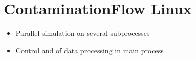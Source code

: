 
\chapter{ContaminationFlow Linux}\label{chapter:Linux}
\begin{itemize}[noitemsep,topsep=0pt, partopsep=0pt]
\item Parallel simulation on several subprocesses
\item Control and of data processing in main process
\end{itemize}
\smallskip
